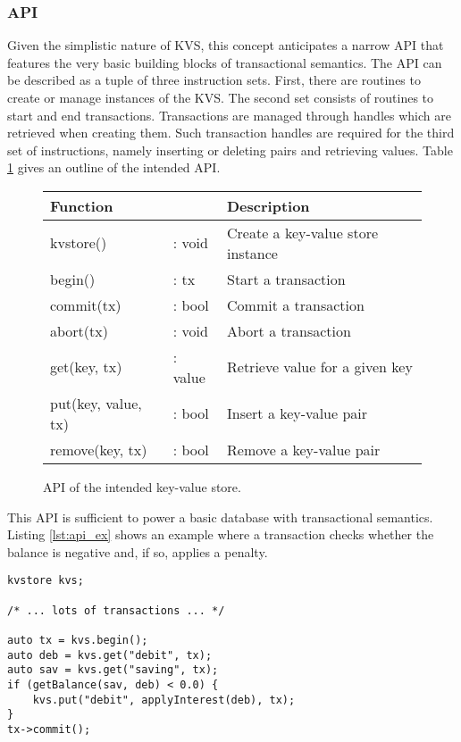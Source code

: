 \subsubsection{API}

Given the simplistic nature of \ac{KVS}, this concept anticipates a narrow
\ac{API} that features the very basic building blocks of transactional
semantics. The \ac{API} can be described as a tuple of three instruction sets.
First, there are routines to create or manage instances of the \ac{KVS}. The
second set consists of routines to start and end transactions. Transactions are
managed through handles which are retrieved when creating them. Such transaction
handles are required for the third set of instructions, namely inserting or
deleting pairs and retrieving values. Table \ref{tab:api} gives an outline of
the intended \ac{API}.

\begin{figure}[!h]
    \centering
    \begin{tabular}{|ll|l|}
        \hline
        \textbf{Function}          &  & \textbf{Description} \\
        \hline
        kvstore()           & : void  & Create a key-value store instance \\
        begin()             & : tx    & Start a transaction \\
        commit(tx)          & : bool  & Commit a transaction \\
        abort(tx)           & : void  & Abort a transaction \\
        get(key, tx)        & : value & Retrieve value for a given key \\
        put(key, value, tx) & : bool  & Insert a key-value pair \\
        remove(key, tx)     & : bool  & Remove a key-value pair \\
        \hline
    \end{tabular}
    \caption{API of the intended key-value store.}
    \label{tab:api}
\end{figure}

This \ac{API} is sufficient to power a basic database with transactional
semantics. Listing \ref{lst:api_ex} shows an example where a transaction checks
whether the balance is negative and, if so, applies a penalty.

\begin{lstlisting}[caption={An example program showcasing the intended API of the KVS.}, captionpos=b, label=lst:api_ex]
kvstore kvs;

/* ... lots of transactions ... */

auto tx = kvs.begin();
auto deb = kvs.get("debit", tx);
auto sav = kvs.get("saving", tx);
if (getBalance(sav, deb) < 0.0) {
	kvs.put("debit", applyInterest(deb), tx);
}
tx->commit();
\end{lstlisting}



